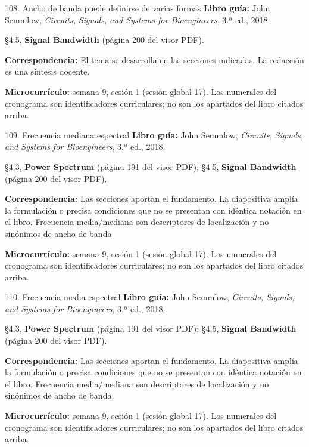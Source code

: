 \documentclass[
  10pt,
  ignorenonframetext,
  aspectratio=169,
  spanish,
]{beamer}
\begin{document}
\begin{frame}{108. Ancho de banda puede definirse de varias formas}
\label{ancho-de-banda-puede-definirse-de-varias-formas}
\textbf{Libro guía:} John Semmlow, \emph{Circuits, Signals, and Systems
for Bioengineers}, 3.ª ed., 2018.

§4.5, \textbf{Signal Bandwidth} (página 200 del visor PDF).

\textbf{Correspondencia:} El tema se desarrolla en las secciones
indicadas. La redacción es una síntesis docente.

\textbf{Microcurrículo:} semana 9, sesión 1 (sesión global 17). Los
numerales del cronograma son identificadores curriculares; no son los
apartados del libro citados arriba.
\end{frame}

\begin{frame}{109. Frecuencia mediana espectral}
\label{frecuencia-mediana-espectral}
\textbf{Libro guía:} John Semmlow, \emph{Circuits, Signals, and Systems
for Bioengineers}, 3.ª ed., 2018.

§4.3, \textbf{Power Spectrum} (página 191 del visor PDF); §4.5,
\textbf{Signal Bandwidth} (página 200 del visor PDF).

\textbf{Correspondencia:} Las secciones aportan el fundamento. La
diapositiva amplía la formulación o precisa condiciones que no se
presentan con idéntica notación en el libro. Frecuencia media/mediana
son descriptores de localización y no sinónimos de ancho de banda.

\textbf{Microcurrículo:} semana 9, sesión 1 (sesión global 17). Los
numerales del cronograma son identificadores curriculares; no son los
apartados del libro citados arriba.
\end{frame}

\begin{frame}{110. Frecuencia media espectral}
\label{frecuencia-media-espectral}
\textbf{Libro guía:} John Semmlow, \emph{Circuits, Signals, and Systems
for Bioengineers}, 3.ª ed., 2018.

§4.3, \textbf{Power Spectrum} (página 191 del visor PDF); §4.5,
\textbf{Signal Bandwidth} (página 200 del visor PDF).

\textbf{Correspondencia:} Las secciones aportan el fundamento. La
diapositiva amplía la formulación o precisa condiciones que no se
presentan con idéntica notación en el libro. Frecuencia media/mediana
son descriptores de localización y no sinónimos de ancho de banda.

\textbf{Microcurrículo:} semana 9, sesión 1 (sesión global 17). Los
numerales del cronograma son identificadores curriculares; no son los
apartados del libro citados arriba.
\end{frame}
\end{document}
